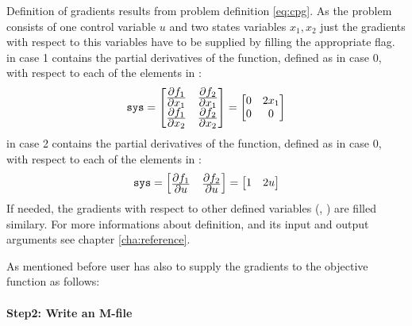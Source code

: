{\small }

Definition of gradients results from problem definition
\eqref{eq:cpg}. As the problem consists of one control variable $u$
and two states variables $x_{1}, x_{2}$ just the gradients with
respect to this variables have to be supplied by filling the
appropriate flag.\\ 
 in case 1 contains the partial derivatives of the
 function, defined as  in case 0, with
respect to each of the elements in : 
\begin{displaymath}
\texttt{sys} = 
\begin{bmatrix}
\frac{\displaystyle \partial{f_{1}}}{\displaystyle \partial{x_{1}}} &
\frac{\displaystyle \partial{f_{2}}}{\displaystyle \partial{x_{1}}}\\
\frac{\displaystyle \partial{f_{1}}}{\displaystyle \partial{x_{2}}} &
\frac{\displaystyle \partial{f_{2}}}{\displaystyle \partial{x_{2}}}
\end{bmatrix} =
\begin{bmatrix}
0 & 2x_{1}\\
0 & 0
\end{bmatrix}
\end{displaymath}
 in case 2 contains the partial derivatives of the
 function, defined as  in case 0, with
respect to each of the elements in :
\begin{displaymath}
\texttt{sys} = 
\begin{bmatrix}
\frac{\displaystyle \partial{f_{1}}}{\displaystyle \partial{u}} &
\frac{\displaystyle \partial{f_{2}}}{\displaystyle \partial{u}}
\end{bmatrix} =
\begin{bmatrix}
1 & 2u
\end{bmatrix} 
\end{displaymath}
If needed, the gradients with respect to other defined variables
(, ) are filled similary. For more informations
about  definition, and its input and output arguments
see chapter \ref{cha:reference}.

As mentioned before user has also to supply the gradients to the
objective function  as follows: 

\paragraph{Step2: Write an M-file~}

